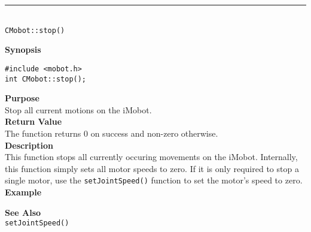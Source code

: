 \noindent
\vspace{5pt}
\rule{4.5in}{0.015in}\\
\noindent
{\LARGE \texttt{CMobot::stop()}}\\
{}

\noindent
{\bf Synopsis}\\
\begin{verbatim}
#include <mobot.h>
int CMobot::stop();
\end{verbatim}

\noindent
{\bf Purpose}\\
Stop all current motions on the iMobot.\\

\noindent
{\bf Return Value}\\
The function returns 0 on success and non-zero otherwise.\\

\noindent
{\bf Description}\\
This function stops all currently occuring movements on the iMobot. Internally, this function simply sets all motor speeds to zero. If it is only required to stop a single motor, use the 
\texttt{setJointSpeed()} function to set the motor's speed to zero. \\

\noindent
{\bf Example}\\
\noindent

\noindent
{\bf See Also}\\
\texttt{setJointSpeed()}

